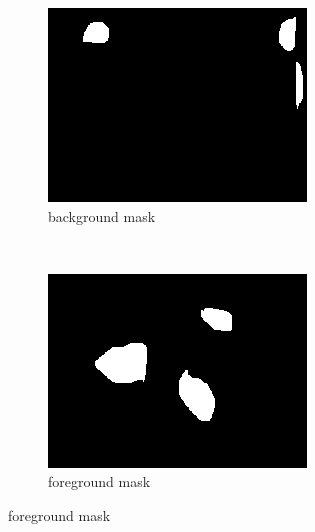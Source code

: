 \documentclass[a4paper]{article}
\begin{document}
\begin{figure}[ht]
	\vspace{2mm}
	\begin{subfigure}[h]{0.48\textwidth}
	\centering
	\includegraphics[width=\textwidth]{imgs/bmask_cars.png}
	\caption*{background mask}
	\end{subfigure}
	~
	\begin{subfigure}[h]{0.48\textwidth}
	\centering
	\includegraphics[width=\textwidth]{imgs/fmask_cars.png}
	\caption*{foreground mask}
	\end{subfigure}
	

\end{figure}
\end{document}
